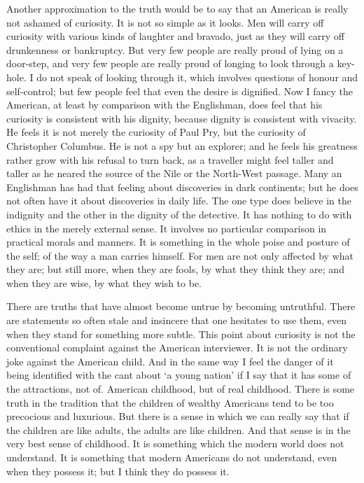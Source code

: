 \documentclass{book}
\begin{document}
Another approximation to the truth would be to say that an American is really not ashamed of curiosity. It is not so simple as it looks. Men will carry off curiosity with various kinds of laughter and bravado, just as they will carry off drunkenness or bankruptcy. But very few people are really proud of lying on a door-step, and very few people are really proud of longing to look through a key-hole. I do not speak of looking through it, which involves questions of honour and self-control; but few people feel that even the desire is dignified. Now I fancy the American, at least by comparison with the Englishman, does feel that his curiosity is consistent with his dignity, because dignity is consistent with vivacity. He feels it is not merely the curiosity of Paul Pry, but the curiosity of Christopher Columbus. He is not a spy but an explorer; and he feels his greatness rather grow with his refusal to turn back, as a traveller might feel taller and taller as he neared the source of the Nile or the North-West passage. Many an Englishman has had that feeling about discoveries in dark continents; but he does not often have it about discoveries in daily life. The one type does believe in the indignity and the other in the dignity of the detective. It has nothing to do with ethics in the merely external sense. It involves no particular comparison in practical morals and manners. It is something in the whole poise and posture of the self; of the way a man carries himself. For men are not only affected by what they are; but still more, when they are fools, by what they think they are; and when they are wise, by what they wish to be.

There are truths that have almost become untrue by becoming untruthful. There are statements so often stale and insincere that one hesitates to use them, even when they stand for something more subtle. This point about curiosity is not the conventional complaint against the American interviewer. It is not the ordinary joke against the American child. And in the same way I feel the danger of it being identified with the cant about ‘a young nation’ if I say that it has some of the attractions, not of. American childhood, but of real childhood. There is some truth in the tradition that the children of wealthy Americans tend to be too precocious and luxurious. But there is a sense in which we can really say that if the children are like adults, the adults are like children. And that sense is in the very best sense of childhood. It is something which the modern world does not understand. It is something that modern Americans do not understand, even when they possess it; but I think they do possess it.
\end{document}
